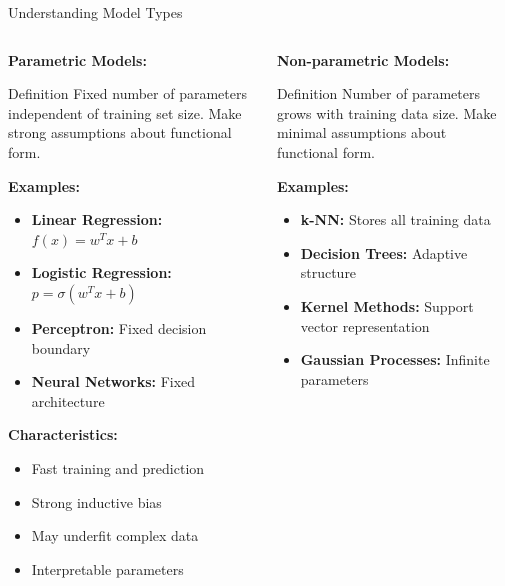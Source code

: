\documentclass[8pt,aspectratio=1610]{beamer}
\begin{document}
\begin{frame}{Understanding Model Types}
\begin{columns}[t]
\begin{column}{0.48\textwidth}
\textbf{Parametric Models:}
\vspace{0.2cm}

\begin{block}{Definition}
Fixed number of parameters independent of training set size. Make strong assumptions about functional form.
\end{block}

\vspace{0.3cm}
\textbf{Examples:}
\begin{itemize}
\setlength{\itemsep}{1pt}
\item \textbf{Linear Regression:} $f(x) = w^T x + b$
\item \textbf{Logistic Regression:} $p = \sigma(w^T x + b)$
\item \textbf{Perceptron:} Fixed decision boundary
\item \textbf{Neural Networks:} Fixed architecture
\end{itemize}

\vspace{0.3cm}
\textbf{Characteristics:}
\begin{itemize}
\setlength{\itemsep}{1pt}
\item Fast training and prediction
\item Strong inductive bias
\item May underfit complex data
\item Interpretable parameters
\end{itemize}
\end{column}

\begin{column}{0.48\textwidth}
\textbf{Non-parametric Models:}
\vspace{0.2cm}

\begin{block}{Definition}
Number of parameters grows with training data size. Make minimal assumptions about functional form.
\end{block}

\vspace{0.3cm}
\textbf{Examples:}
\begin{itemize}
\setlength{\itemsep}{1pt}
\item \textbf{k-NN:} Stores all training data
\item \textbf{Decision Trees:} Adaptive structure
\item \textbf{Kernel Methods:} Support vector representation
\item \textbf{Gaussian Processes:} Infinite parameters
\end{itemize}


\end{column}
\end{columns}
\end{frame}
\end{document}
